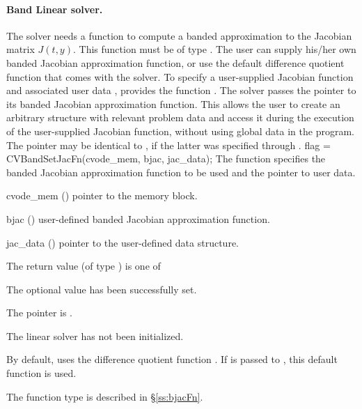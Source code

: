 \noindent\paragraph{\bf Band Linear solver.}
The 
{\cvband} solver needs a function to compute a banded approximation to
the Jacobian matrix $J(t,y)$.  This function must be of type . 
The user can supply his/her own banded Jacobian approximation function, 
or use the default difference quotient function  
that comes with the {\cvband} solver.
To specify a user-supplied Jacobian function  and associated user 
data , {\cvband} provides the function .
The {\cvband} solver passes the pointer 
to its banded Jacobian approximation function. This allows the user to
create an arbitrary structure with relevant problem data and access it
during the execution of the user-supplied Jacobian function, without
using global data in the program.  The pointer  may be
identical to , if the latter was specified through .
{
  flag = CVBandSetJacFn(cvode\_mem, bjac, jac\_data);
}
{
  The function  specifies the banded Jacobian
  approximation function to be used and the pointer to user data.
}
{
  \begin{args}
  \item[cvode\_mem] ()
    pointer to the {\cvode} memory block.
  \item[bjac] ()
    user-defined banded Jacobian approximation function.
  \item[jac\_data] ()
    pointer to the user-defined data structure.
  \end{args}
}
{
  The return value  (of type ) is one of
  \begin{args}
  \item[\Id{CVBAND\_SUCCESS}] 
    The optional value has been successfully set.
  \item[\Id{CVBAND\_MEM\_NULL}]
    The  pointer is .
  \item[\Id{CVBAND\_LMEM\_NULL}]
    The {\cvband} linear solver has not been initialized.
  \end{args}
}
{
  By default, {\cvband} uses the difference quotient function .
  If  is passed to , this default function is used.

  The function type  is described in \S\ref{ss:bjacFn}.
}

